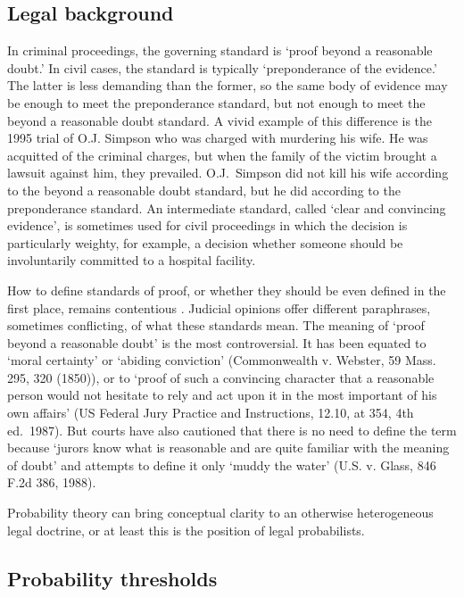\documentclass{article}
\begin{document}
\subsection{Legal background}
\label{subsec:legal-background}

 
In criminal proceedings, the governing standard is `proof beyond a reasonable doubt.' In civil cases, the standard is typically `preponderance of the evidence.' The latter is less demanding than the former, so the same body of evidence may be enough to meet the preponderance standard, but not enough to meet the beyond a reasonable doubt standard. A vivid example of this difference is the 1995 trial of O.J. Simpson who was charged with murdering his wife. He was acquitted of the criminal charges, but when the family of the victim brought a lawsuit against him, they prevailed. O.J.\ Simpson did not kill his wife according to the beyond a reasonable doubt standard, but he did according to the preponderance standard. An intermediate standard, called `clear and convincing evidence', is sometimes used for civil proceedings in which the decision is particularly weighty, for example, a decision whether someone should be involuntarily committed to a hospital facility. 



How to define standards of proof, or whether they should be even defined in the first place, remains  contentious \citep{diamond90,newman1993, Horowitz1996,laudan2006truth,walen2015}. Judicial opinions offer different paraphrases, sometimes conflicting, of what these standards mean. The meaning of `proof beyond a reasonable doubt' is the most controversial. It has been equated to `moral certainty' or `abiding conviction' (Commonwealth v. Webster, 59 Mass. 295, 320 (1850)), or to `proof of such a convincing character that a reasonable person would not hesitate to rely and act upon it in the most important of his own affairs' (US Federal Jury Practice and Instructions, 12.10, at 354, 4th ed.\ 1987). But courts have also cautioned that there is no need to define the term because `jurors know what is reasonable and are quite familiar with the meaning of doubt' and attempts to define it only `muddy the water' (U.S. v. Glass, 846 F.2d 386, 1988).

Probability theory can bring conceptual clarity 
to an otherwise heterogeneous legal doctrine, 
or at least this is the position of legal probabilists.

\subsection{Probability thresholds}
\end{document}

